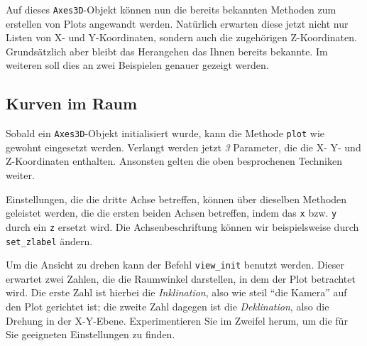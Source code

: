 Auf dieses \texttt{Axes3D}-Objekt können nun die bereits bekannten Methoden zum erstellen von Plots angewandt werden. Natürlich erwarten diese jetzt nicht nur Listen von X- und Y-Koordinaten, sondern auch die zugehörigen Z-Koordinaten. Grundsätzlich aber bleibt das Herangehen das Ihnen bereits bekannte. Im weiteren soll dies an zwei Beispielen genauer gezeigt werden.

\subsection{Kurven im Raum}
Sobald ein \texttt{Axes3D}-Objekt initialisiert wurde, kann die Methode \texttt{plot} wie gewohnt eingesetzt werden. Verlangt werden jetzt \emph{3} Parameter, die die X- Y- und Z-Koordinaten enthalten. Ansonsten gelten die oben besprochenen Techniken weiter.

Einstellungen, die die dritte Achse betreffen, können über dieselben Methoden geleistet werden, die die ersten beiden Achsen betreffen, indem das \texttt{x} bzw. \texttt{y} durch ein \texttt{z} ersetzt wird. Die Achsenbeschriftung können wir beispielsweise durch \texttt{set\_zlabel} ändern.

Um die Ansicht zu drehen kann der Befehl \texttt{view\_init} benutzt werden. Dieser erwartet zwei Zahlen, die die Raumwinkel darstellen, in dem der Plot betrachtet wird. Die erste Zahl ist hierbei die \emph{Inklination}, also wie steil \enquote{die Kamera} auf den Plot gerichtet ist; die zweite Zahl dagegen ist die \emph{Deklination}, also die Drehung in der X-Y-Ebene. Experimentieren Sie im Zweifel herum, um die für Sie geeigneten Einstellungen zu finden.

